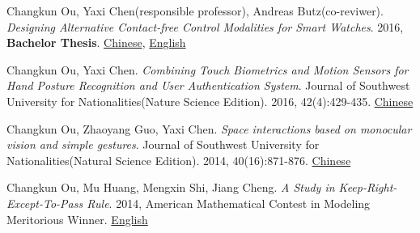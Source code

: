    \item{
       Changkun Ou, Yaxi Chen(responsible professor), Andreas Butz(co-reviwer).
       \emph{Designing Alternative Contact-free Control Modalities for Smart Watches}. 
       2016, \textbf{Bachelor Thesis}. \href{https://changkun.us/files/cv/bachelor-thesis-cn.html}{Chinese}, 
       \href{https://changkun.us/files/cv/bachelor-thesis-en.html}{English}
   }
   \item{
       Changkun Ou, Yaxi Chen. 
       \emph{Combining Touch Biometrics and Motion Sensors for Hand Posture Recognition and User Authentication System}. 
       Journal of Southwest University for Nationalities(Nature Science Edition). 
       2016, 42(4):429-435. \href{https://changkun.us/files/cv/touch.swun.html}{Chinese}
   }
   \item{
       Changkun Ou, Zhaoyang Guo, Yaxi Chen.
       \emph{Space interactions based on monocular vision and simple gestures}. 
       Journal of Southwest University for Nationalities(Natural Science Edition). 
       2014, 40(16):871-876. \href{https://changkun.us/files/cv/vision.swun.html}{Chinese}
   }
   \item{
       Changkun Ou, Mu Huang, Mengxin Shi, Jiang Cheng. 
       \emph{A Study in Keep-Right-Except-To-Pass Rule}. 
       2014, American Mathematical Contest in Modeling Meritorious Winner. \href{https://changkun.us/files/cv/28922.public.html}{English}
   }
 \resumeSubHeadingListEnd
